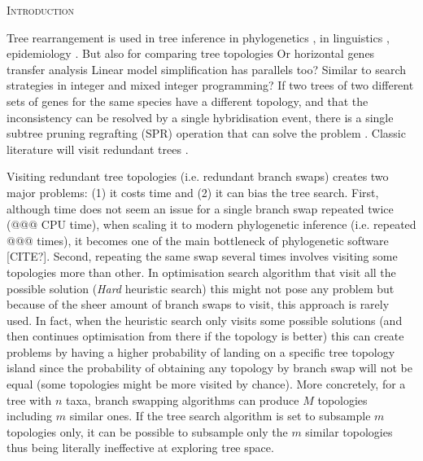 \documentclass[12pt,letterpaper]{article}
\renewcommand{\section}[1]{%
\bigskip
\begin{center}
\begin{Large}
\normalfont\scshape #1
\medskip
\end{Large}
\end{center}}
\begin{document}
\section{Introduction}

Tree rearrangement is used in tree inference in phylogenetics \citep[e.g.][]{swofford2003paup,Stamatakis21012014,Ronquist2012mrbayes}, in linguistics \citep[e.g.][]{Bouckaert24082012}, epidemiology \citep[e.g.][]{Gire1369}.
But also for comparing tree topologies \citep[e.g.][]{allen2001subtree,kuhner2015treComparison}
Or horizontal genes transfer analysis \citep[e.g.][]{mcfadden1995something,bordewich2005computational}
Linear model simplification has parallels too?
Similar to search strategies in integer and mixed integer programming?
If two trees of two different sets of genes for the same species have a different topology, and that the inconsistency can be resolved by a single hybridisation event, there is a single subtree pruning regrafting (SPR) operation that can solve the problem \citep{bordewich2005computational}.
Classic literature will visit redundant trees \citep{allen2001subtree,felsenstein2004inferring}.

Visiting redundant tree topologies (i.e. redundant branch swaps) creates two major problems: (1) it costs time and (2) it can bias the tree search.
First, although time does not seem an issue for a single branch swap repeated twice (@@@ CPU time), when scaling it to modern phylogenetic inference (i.e. repeated @@@ times), it becomes one of the main bottleneck of phylogenetic software [CITE?].
Second, repeating the same swap several times involves visiting some topologies more than other.
In optimisation search algorithm that visit all the possible solution (\textit{Hard} heuristic search) %
 this might not pose any problem but because of the sheer amount of branch swaps to visit, this approach is rarely used.
In fact, when the heuristic search only visits some possible solutions (and then continues optimisation from there if the topology is better) this can create problems by having a higher probability of landing on a specific tree topology island since the probability of obtaining any topology by branch swap will not be equal (some topologies might be more visited by chance).
More concretely, for a tree with $n$ taxa, branch swapping algorithms can produce $M$ topologies including $m$ similar ones.
If the tree search algorithm is set to subsample $m$ topologies only, it can be possible to subsample only the $m$ similar topologies thus being literally ineffective at exploring tree space.
\end{document}
